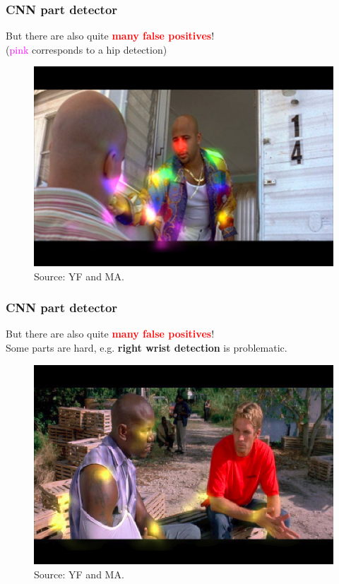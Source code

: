 \documentclass{beamer}
\newcommand\red[1]{\textcolor{red}{\textbf{#1}}}
\begin{document}
    
    \begin{frame}[c]
    	\frametitle{CNN part detector}
    	\begin{center}
    	But there are also quite \red{many false positives}! \\
    	(\textcolor{magenta}{pink} corresponds to a hip detection)
    		\begin{figure}
    			\includegraphics[scale=0.59]{false_positive.png} \\
    			\scriptsize Source: YF and MA.
    		\end{figure} 
    	\end{center}
    \end{frame}
    
    \begin{frame}[c]
       	\frametitle{CNN part detector}
       	\begin{center}
       		But there are also quite \red{many false positives}! \\
       		Some parts are hard, e.g. \textbf{right wrist detection} is problematic.
       		\begin{figure}
       			\includegraphics[scale=0.35]{cnn_pd_rwri_fail.png} \\
       			\scriptsize Source: YF and MA.
       		\end{figure} 
       	\end{center}
    \end{frame}
\end{document}
